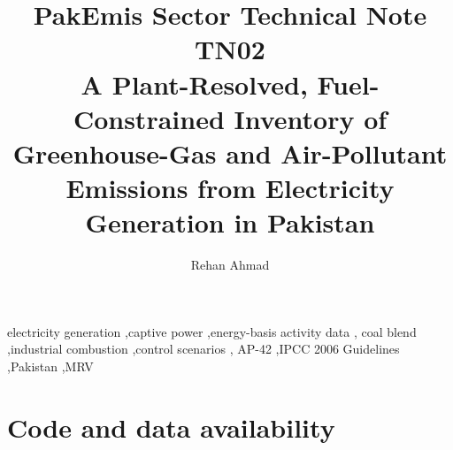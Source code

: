 \documentclass[5p,times,authoryear]{elsarticle}
\begin{document}
\begin{frontmatter}

\title{PakEmis Sector Technical Note TN02\\[4pt]
A Plant-Resolved, Fuel-Constrained Inventory of Greenhouse-Gas and
Air-Pollutant Emissions from Electricity Generation in Pakistan}

\author[paqi]{Rehan Ahmad}

\address[paqi]{Pakistan Air Quality Initiative (PAQI), Karachi, Pakistan}


\begin{abstract}

\end{abstract}

\begin{keyword}
electricity generation \sep captive power \sep energy-basis activity data \sep
coal blend \sep industrial combustion \sep control scenarios \sep
AP-42 \sep IPCC 2006 Guidelines \sep Pakistan \sep MRV
\end{keyword}

\end{frontmatter}



\ReleaseCover







\FloatBarrier


\FloatBarrier

\FloatBarrier



\FloatBarrier

\section*{Code and data availability}
\end{document}

